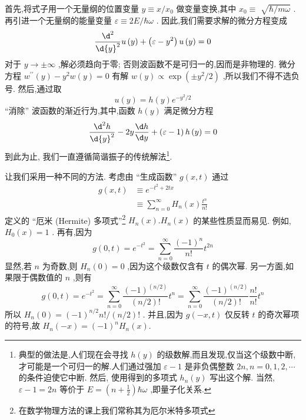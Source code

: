 首先,将式子用一个无量纲的位置变量 $y \equiv x/{x}_{0}$ 做变量变换,其中 ${x}_{0} \equiv$ $\sqrt{\hbar /{m\omega }}$ . 再引进一个无量纲的能量变量 $\varepsilon \equiv {2E}/\hbar \omega$ . 因此,我们需要求解的微分方程变成
\begin{equation}
\frac{{\d}^{2}}{\d{y}^{2}}u\left( y\right) + \left( {\varepsilon - {y}^{2}}\right) u\left( y\right) = 0
\end{equation}
对于 $y \rightarrow \pm \infty$ ,解必须趋向于零; 否则波函数不是可归一的,因而是非物理的. 微分方程 ${w}^{\prime \prime }\left( y\right) - {y}^{2}w\left( y\right) = 0$ 有解 $w\left( y\right) \propto \exp \left( {\pm {y}^{2}/2}\right)$ ,所以我们不得不选负号. 然后,通过取
\begin{equation}
u\left( y\right) = h\left( y\right) {e}^{-{y}^{2}/2}
\end{equation}
“消除” 波函数的渐近行为,其中,函数 $h\left( y\right)$ 满足微分方程
\begin{equation}
\frac{{\d}^{2}h}{\d{y}^{2}} - {2y}\frac{\d h}{\d y} + \left( {\varepsilon - 1}\right) h\left( y\right) = 0
\end{equation}
到此为止, 我们一直遵循简谐振子的传统解法\footnote{典型的做法是,人们现在会寻找 $h\left( y\right)$ 的级数解,而且发现,仅当这个级数中断,才可能是一个可归一的解.人们通过强加 $\varepsilon - 1$ 是非负偶整数 ${2n}, n = 0,1,2,\cdots$ 的条件迫使它中断. 然后, 使用得到的多项式 ${h}_{n}\left( y\right)$ 写出这个解. 当然, $\varepsilon - 1 = {2n}$ 等价于 $E = \left( {n + \frac{1}{2}}\right) \hbar \omega$ ,即量子化关系.}.

让我们采用一种不同的方法. 考虑由 “生成函数” $g\left( {x, t}\right)$ 通过
\begin{equation}
\begin{aligned}
	g\left( {x, t}\right) &\equiv {e}^{-{t}^{2} + {2tx}}\\
	&\equiv \mathop{\sum }\limits_{{n = 0}}^{\infty }{H}_{n}\left( x\right) \frac{{t}^{n}}{n!}
\end{aligned}
\end{equation}
定义的 “厄米 (Hermite) 多项式”\footnote{在数学物理方法的课上我们常称其为厄尔米特多项式} ${H}_{n}\left( x\right) .{H}_{n}\left( x\right)$ 的某些性质显而易见. 例如, ${H}_{0}\left( x\right)= 1$ . 再有,因为
\begin{equation}
g\left( {0, t}\right) = {e}^{-{t}^{2}} = \mathop{\sum }\limits_{{n = 0}}^{\infty }\frac{{\left( -1\right) }^{n}}{n!}{t}^{2n}
\end{equation}
显然,若 $n$ 为奇数,则 ${H}_{n}\left( 0\right) = 0$ ,因为这个级数仅含有 $t$ 的偶次幂. 另一方面,如果限于偶数值的 $n$ ,则有
\begin{equation}
g\left( {0, t}\right) = {e}^{-{t}^{2}} = \mathop{\sum }\limits_{{n = 0}}^{\infty }\frac{{\left( -1\right) }^{\left( n/2\right) }}{\left( {n/2}\right) !}{t}^{n} = \mathop{\sum }\limits_{{n = 0}}^{\infty }\frac{{\left( -1\right) }^{\left( n/2\right) }}{\left( {n/2}\right) !}\frac{n!}{n!}{t}^{n} 
\end{equation}
所以 ${H}_{n}\left( 0\right) = {\left( -1\right) }^{n/2}n!/\left( {n/2}\right) !$ . 并且,因为 $g\left( {-x, t}\right)$ 仅反转 $t$ 的奇次幂项的符号,故 ${H}_{n}\left( {-x}\right) = {\left( -1\right) }^{n}{H}_{n}\left( x\right) .$

